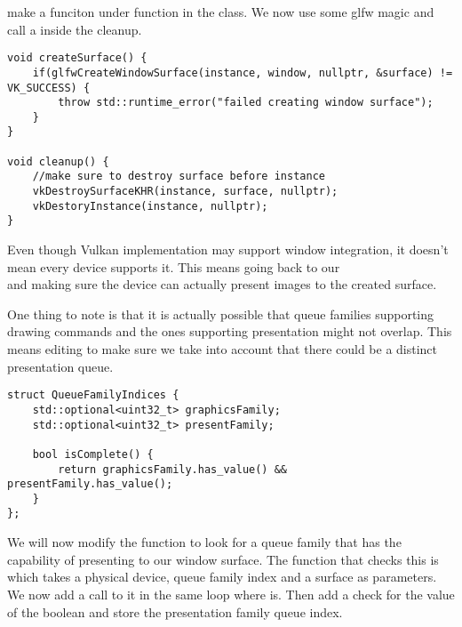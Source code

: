 \par make a  funciton under  function in the class. We now use some glfw magic and call a  inside the cleanup.

\begin{center}
\begin{minipage}{0.95\linewidth}
\begin{lstlisting}
void createSurface() {
    if(glfwCreateWindowSurface(instance, window, nullptr, &surface) != VK_SUCCESS) {
        throw std::runtime_error("failed creating window surface");
    }
}

void cleanup() {
    //make sure to destroy surface before instance
    vkDestroySurfaceKHR(instance, surface, nullptr);
    vkDestoryInstance(instance, nullptr);
}

\end{lstlisting}
\end{minipage}
\end{center}

\par Even though Vulkan implementation may support window integration, it doesn't mean every device supports it. This means going back to our \\  and making sure the device can actually present images to the created surface.

\par One thing to note is that it is actually possible that queue families supporting drawing commands and the ones supporting presentation might not overlap. This means editing  to make sure we take into account that there could be a distinct presentation queue.

\begin{center}
\begin{minipage}{0.95\linewidth}
\begin{lstlisting}
struct QueueFamilyIndices {
    std::optional<uint32_t> graphicsFamily;
    std::optional<uint32_t> presentFamily;

    bool isComplete() {
        return graphicsFamily.has_value() && presentFamily.has_value();
    }
};
\end{lstlisting}
\end{minipage}
\end{center}

\par We will now modify the  function to look for a queue family that has the capability of presenting to our window surface. The function that checks this is
 which takes a physical device, queue family index and a surface as parameters. We now add a call to it in the same loop where  is. Then add a check for the value of the boolean and store the presentation family queue index.

